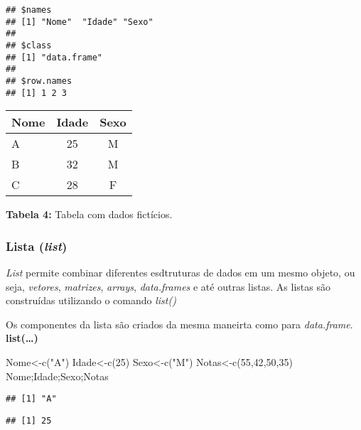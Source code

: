 \documentclass[
]{book}
\newenvironment{Shaded}{\begin{snugshade}}{\end{snugshade}}
\newcommand{\DecValTok}[1]{\textcolor[rgb]{0.00,0.00,0.81}{#1}}
\newcommand{\FunctionTok}[1]{\textcolor[rgb]{0.00,0.00,0.00}{#1}}
\newcommand{\NormalTok}[1]{#1}
\newcommand{\OtherTok}[1]{\textcolor[rgb]{0.56,0.35,0.01}{#1}}
\newcommand{\StringTok}[1]{\textcolor[rgb]{0.31,0.60,0.02}{#1}}
\begin{document}
\begin{verbatim}
## $names
## [1] "Nome"  "Idade" "Sexo" 
## 
## $class
## [1] "data.frame"
## 
## $row.names
## [1] 1 2 3
\end{verbatim}

\begin{tabular}{l|c|c}
\hline
Nome & Idade & Sexo\\
\hline
A & 25 & M\\
\hline
B & 32 & M\\
\hline
C & 28 & F\\
\hline
\end{tabular}

\textbf{Tabela 4:} Tabela com dados fictícios.

\hypertarget{lista-list}{%
\subsubsection{\texorpdfstring{Lista (\emph{list})}{Lista (list)}}\label{lista-list}}

\emph{List} permite combinar diferentes esdtruturas de dados em um mesmo objeto, ou seja, \emph{vetores}, \emph{matrizes}, \emph{arrays}, \emph{data.frames} e até outras listas.
As listas são construídas utilizando o comando \emph{list()}

Os componentes da lista são criados da mesma maneirta como para \emph{data.frame}.
\textbf{list(\ldots)}

\begin{Shaded}
\begin{Highlighting}[]
\NormalTok{Nome}\OtherTok{\textless{}{-}}\FunctionTok{c}\NormalTok{(}\StringTok{"A"}\NormalTok{)}
\NormalTok{Idade}\OtherTok{\textless{}{-}}\FunctionTok{c}\NormalTok{(}\DecValTok{25}\NormalTok{)}
\NormalTok{Sexo}\OtherTok{\textless{}{-}}\FunctionTok{c}\NormalTok{(}\StringTok{"M"}\NormalTok{)}
\NormalTok{Notas}\OtherTok{\textless{}{-}}\FunctionTok{c}\NormalTok{(}\DecValTok{55}\NormalTok{,}\DecValTok{42}\NormalTok{,}\DecValTok{50}\NormalTok{,}\DecValTok{35}\NormalTok{)}
\NormalTok{Nome;Idade;Sexo;Notas}
\end{Highlighting}
\end{Shaded}

\begin{verbatim}
## [1] "A"
\end{verbatim}

\begin{verbatim}
## [1] 25
\end{verbatim}
\end{document}
